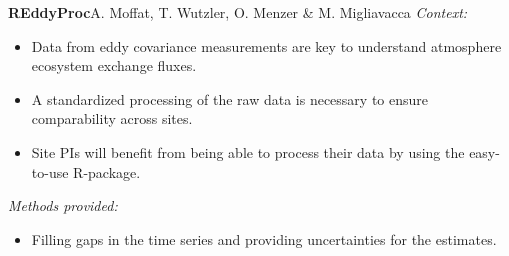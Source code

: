 
  {\vspace{.2cm}\textbf{REddyProc}\hfill\normalsize{A. Moffat, T. Wutzler, O. Menzer \& M. Migliavacca}}
\alert{\textit{Context:}}

\begin{itemize}
    \item Data from eddy covariance measurements are key to understand atmosphere ecosystem exchange fluxes.
    \item A standardized processing of the raw data is necessary to ensure comparability across sites.
    \item Site PIs will benefit from being able to process their data by using the easy-to-use R-package.
\end{itemize}
 
\alert{\textit{Methods provided:}}
\begin{itemize}
    \item Filling gaps in the time series and providing uncertainties for the estimates.
\end{itemize}
\vspace{1cm}

